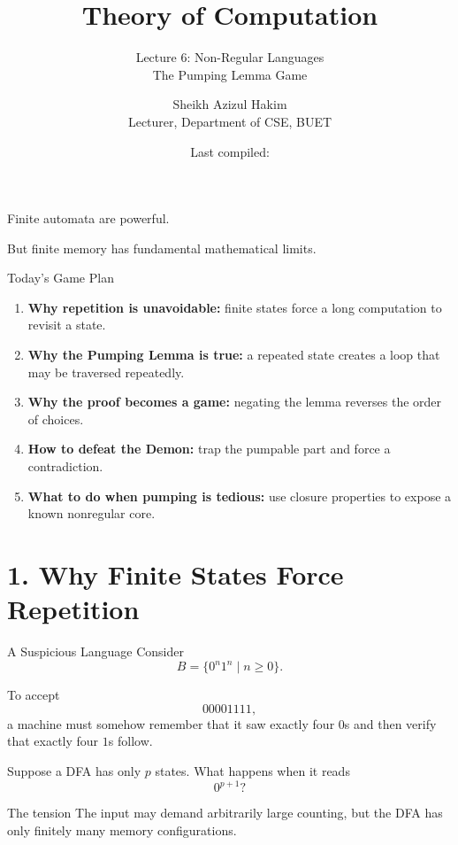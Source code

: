 \documentclass[10pt,aspectratio=169]{beamer}
\title{Theory of Computation}
\subtitle{Lecture 6: Non-Regular Languages\\The Pumping Lemma Game}
\author{\small Sheikh Azizul Hakim\\Lecturer, Department of CSE, BUET}
\date{Last compiled: \LastCompiled}
\begin{document}
\maketitle

\begin{frame}[standout]
Finite automata are powerful.

But finite memory has fundamental mathematical limits.
\end{frame}

\begin{frame}{Today's Game Plan}
\begin{enumerate}
    \item \textbf{Why repetition is unavoidable:}
          finite states force a long computation to revisit a state.
    \item \textbf{Why the Pumping Lemma is true:}
          a repeated state creates a loop that may be traversed repeatedly.
    \item \textbf{Why the proof becomes a game:}
          negating the lemma reverses the order of choices.
    \item \textbf{How to defeat the Demon:}
          trap the pumpable part and force a contradiction.
    \item \textbf{What to do when pumping is tedious:}
          use closure properties to expose a known nonregular core.
\end{enumerate}
\end{frame}

\section{1. Why Finite States Force Repetition}

\begin{frame}{A Suspicious Language}
Consider
\[
B=\{0^n1^n\mid n\geq 0\}.
\]

To accept
\[
00001111,
\]
a machine must somehow remember that it saw exactly four $0$s and then
verify that exactly four $1$s follow.

\vspace{0.7em}
Suppose a DFA has only $p$ states. What happens when it reads
\[
0^{p+1}?
\]

\begin{block}{The tension}
The input may demand arbitrarily large counting, but the DFA has only
finitely many memory configurations.
\end{block}
\end{frame}
\end{document}
